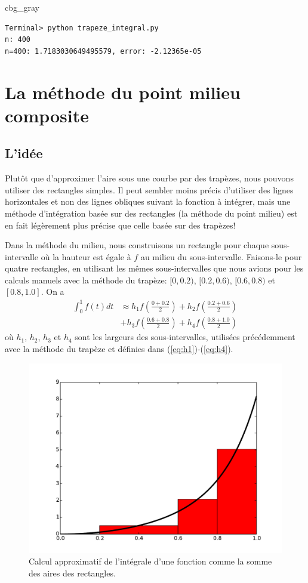 \documentclass[%
oneside,                 %
final,                   %
10pt]{article}
\newenvironment{_cod_tight}[1]{
   \def\FrameCommand{\colorbox{#1}}
   \FrameRule0.6pt\MakeFramed {\FrameRestore}\vskip3mm}
   {\vskip0mm\endMakeFramed}
\newenvironment{cod}[1]{
\bgroup\rmfamily
\fboxsep=0mm\relax
\begin{_cod_tight}{#1}
\list{}{\parsep=-2mm\parskip=0mm\topsep=0pt\leftmargin=2mm
\rightmargin=2\leftmargin\leftmargin=4pt\relax}
\item\relax}
{\endlist\end{_cod_tight}\egroup}
\begin{document}
\begin{cod}{cbg_gray}\begin{verbatim}
Terminal> python trapeze_integral.py
n: 400
n=400: 1.7183030649495579, error: -2.12365e-05
\end{verbatim}
\end{cod}
\noindent
\section{La méthode du point milieu composite}
\subsection{L'idée}
Plutôt que d'approximer l'aire sous une courbe par des trapèzes, nous pouvons utiliser des rectangles simples. Il peut sembler moins précis d'utiliser des lignes horizontales et non des lignes obliques suivant la fonction à intégrer, mais une méthode d'intégration basée sur des rectangles (la méthode du point milieu) est en fait légèrement plus précise que celle basée sur des trapèzes!

Dans la méthode du milieu, nous construisons un rectangle pour chaque sous-intervalle où la hauteur est égale à $f$ au milieu du sous-intervalle. Faisons-le pour quatre rectangles, en utilisant les mêmes sous-intervalles que nous avions pour les calculs manuels avec la méthode du trapèze: $[0,0.2)$, $[0.2,0.6)$, $[0.6,0.8)$ et $[0.8,1.0]$. On a
\begin{align}
\int_0^1 f(t)dt &\approx
   h_1 f\left(\frac{0 + 0.2}{2}\right) +
   h_2 f\left(\frac{0.2 + 0.6}{2}\right) \nonumber  \\
&+ h_3 f\left(\frac{0.6 + 0.8}{2}\right) +
   h_4 f\left(\frac{0.8 + 1.0}{2}\right)
\end{align}
où $h_1$, $h_2$, $h_3$ et $h_4$ sont les largeurs des sous-intervalles, utilisées précédemment avec la méthode du trapèze et définies dans (\ref{eq:h1})-(\ref{eq:h4}).


\begin{figure}[!ht]  %
  \centerline{\includegraphics[width=0.7\linewidth]{imgs/viz_midpoint.pdf}}
  \caption{
  Calcul approximatif de l'intégrale d'une fonction comme la somme des aires des rectangles. \label{fig:viz_midpoint}
  }
\end{figure}
\end{document}
